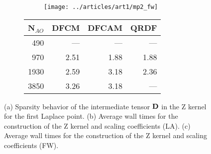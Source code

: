 \begin{figure}[htp]
\begin{subfigure}{\textwidth}
\begin{subfigure}{0.45\textwidth}
\centering
\texttt{[image: ../articles/art1/mp2\_fw]}
\end{subfigure}
\hfill
\begin{subtable}{0.4\textwidth}
\centering
\begin{tabular}{rrrr}
\hline
N$_{AO}$ & DFCM & DFCAM & QRDF \\
\hline 
490 & --- & --- & --- \\ 
970 & 2.51 & 1.88 & 1.88 \\ 
1930 & 2.59 & 3.18 & 2.36 \\ 
3850 & 3.26 & 3.18 & --- \\ 
 \hline
\end{tabular}
\end{subtable}
\caption{}
\label{fig:GS_ZSCALE_FW}
\end{subfigure}

\caption{(a) Sparsity behavior of the intermediate tensor $\mathbf{D}$ in the Z kernel for the first Laplace point. (b) Average wall times for the construction of the Z kernel and scaling coefficients (LA). (c) Average wall times for the construction of the Z kernel and scaling coefficients (FW).}

\end{figure}